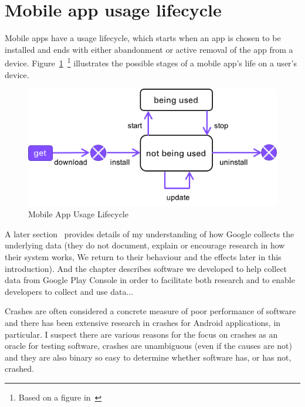 \section{Mobile app usage lifecycle}
Mobile apps have a usage lifecycle, which starts when an app is chosen to be installed and ends with either abandonment or active removal of the app from a device. Figure~\ref{fig:mobile_app_usage_lifecycle}~\footnote{Based on a figure in~\cite{bohmer2011falling_asleep_with_angry_birds}} illustrates the possible stages of a mobile app's life on a user's device.

\begin{figure}[ht]
    \centering
    \includegraphics[width=12cm]{images/mobile_app_usage_lifecycle.png}
    \caption{Mobile App Usage Lifecycle}
    \label{fig:mobile_app_usage_lifecycle}
\end{figure}

A later section~\href{platform-level-analytics}{\emph{}} provides details of my understanding of how Google collects the underlying data (they do not document, explain or encourage research in how their system works, We return to their behaviour and the effects later in this introduction). And the chapter \href{chapter-software-we-developed-for-google-play-console}{\emph{}} describes software we developed to help collect data from Google Play Console in order to facilitate both research and to enable developers to collect and use data...

Crashes are often considered a concrete measure of poor performance of software and there has been extensive research in crashes for Android applications, in particular. I suspect there are various reasons for the focus on crashes as an oracle for testing software, crashes are unambiguous (even if the causes are not) and they are also binary so easy to determine whether software has, or has not, crashed. 

